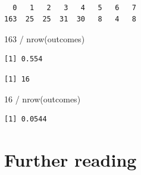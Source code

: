 \documentclass[
  letterpaper,
  DIV=11,
  numbers=noendperiod]{scrreprt}
\newenvironment{Shaded}{\begin{snugshade}}{\end{snugshade}}
\newcommand{\DecValTok}[1]{\textcolor[rgb]{0.25,0.63,0.44}{#1}}
\newcommand{\DocumentationTok}[1]{\textcolor[rgb]{0.73,0.13,0.13}{\textit{#1}}}
\newcommand{\FunctionTok}[1]{\textcolor[rgb]{0.02,0.16,0.49}{#1}}
\newcommand{\NormalTok}[1]{\textcolor[rgb]{0.00,0.44,0.13}{#1}}
\newcommand{\SpecialCharTok}[1]{\textcolor[rgb]{0.25,0.44,0.63}{#1}}
\begin{document}
\begin{Shaded}
\end{Shaded}

\begin{verbatim}

  0   1   2   3   4   5   6   7 
163  25  25  31  30   8   4   8 
\end{verbatim}

\begin{Shaded}
\begin{Highlighting}[]
\DecValTok{163} \SpecialCharTok{/} \FunctionTok{nrow}\NormalTok{(outcomes)}
\end{Highlighting}
\end{Shaded}

\begin{verbatim}
[1] 0.554
\end{verbatim}

\begin{Shaded}
\end{Shaded}

\begin{verbatim}
[1] 16
\end{verbatim}

\begin{Shaded}
\begin{Highlighting}[]
\DecValTok{16} \SpecialCharTok{/} \FunctionTok{nrow}\NormalTok{(outcomes)}
\end{Highlighting}
\end{Shaded}

\begin{verbatim}
[1] 0.0544
\end{verbatim}

\hypertarget{further-reading}{%
\section{Further reading}\label{further-reading}}
\end{document}
